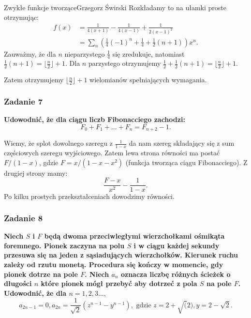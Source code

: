 \begin{referat}{Zwykłe funkcje tworzące}{Grzegorz Świrski}
Rozkładamy to na ułamki proste otrzymując:
\begin{align*}
f(x) &= \frac{1}{4(x+1)} - \frac{1}{4(x-1)} + \frac{1}{2(x-1)^2} \\
     &= \sum_n \left(\frac{1}{4}(-1)^n + \frac{1}{4} + \frac{1}{2}(n+1)\right)x^n.
\end{align*}
Zauważmy, że dla $n$ nieparzystego $\frac{1}{4}$ się zredukuje, natomiast\\
$\frac{1}{2}(n+1) = \lfloor \frac{n}{2} \rfloor + 1$. Dla $n$ parzystego otrzymujemy
$\frac{1}{2} + \frac{1}{2}(n+1) = \lfloor \frac{n}{2} \rfloor + 1$.

Zatem otrzymujemy $\lfloor \frac{n}{2} \rfloor + 1$ wielomianów spełniających wymagania.

\subsubsection{Zadanie 7}
\textbf{Udowodnić, że dla ciągu liczb Fibonacciego zachodzi:}
$$ F_0 + F_1 + ... + F_n = F_{n+2} - 1.$$

Wiemy, że splot dowolnego szeregu z $\frac{1}{1-x}$ da nam szereg składający
się z sum częściowych szeregu wyjściowego. Zatem lewa strona równości ma postać $F/(1-x)$,
gdzie $F= x/(1-x-x^2)$ (funkcja tworząca ciągu Fibonacciego). Z drugiej strony mamy:
$$\frac{F-x}{x^2} - \frac{1}{1-x}.$$
Po kilku prostych przekształceniach dowodzimy równości.

\subsubsection{Zadanie 8}
\textbf{Niech $S$ i $F$ będą dwoma przeciwległymi wierzchołkami ośmikąta
foremnego. Pionek zaczyna na polu $S$ i w ciągu każdej sekundy przesuwa
się na jeden z sąsiadujących wierzchołków. Kierunek ruchu zależy od
rzutu monetą. Procedura się kończy w momencie, gdy pionek dotrze na pole $F$.
Niech $a_n$ oznacza liczbę różnych ścieżek o długości $n$ które pionek mógł
przebyć aby dotrzeć z pola $S$ na pole $F$. Udowodnić, że dla $n=1,2,3...,$
$$a_{2n-1} = 0, a_{2n} = \frac{1}{\sqrt{2}}(z^{n-1} - y^{n-1}), \text{ gdzie }
z = 2 + \sqrt(2), y = 2 - \sqrt{2}.$$}


\end{referat}
